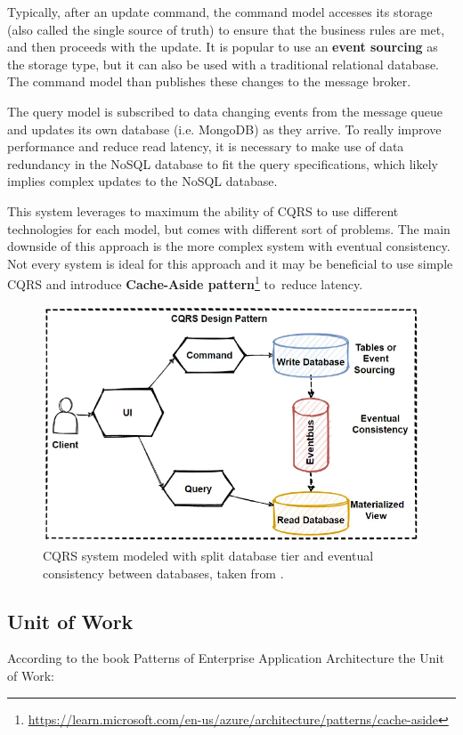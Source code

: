 Typically, after an update command, the command model accesses its storage (also called the single source of truth) to ensure that the business rules are met, and then proceeds with the update. It is popular to use an \textbf{event sourcing} as the storage type, but it can also be used with a traditional relational database. The command model than publishes these changes to the message broker.

The query model is subscribed to data changing events from the message queue and updates its own database (i.e. MongoDB) as they arrive. To really improve performance and reduce read latency, it is necessary to make use of data redundancy in the NoSQL database to fit the query specifications, which likely implies complex updates to the NoSQL database.

This system leverages to maximum the ability of CQRS to use different technologies for each model, but comes with different sort of problems. The main downside of this approach is the more complex system with eventual consistency. Not every system is ideal for this approach and it may be beneficial to use simple CQRS and introduce \textbf{Cache-Aside pattern}\footnote{\url{https://learn.microsoft.com/en-us/azure/architecture/patterns/cache-aside}} to~reduce latency.

\begin{figure} [H]
    \centering
    \includegraphics[width=\textwidth]{figures/cqrs-es.png}
    \caption{CQRS system modeled with split database tier and eventual consistency between databases, taken from \cite{mehmet_ozkaya:cqrs}.}
    \label{fig:arch:cqrs_es}
\end{figure}

\newpage
\subsection{Unit of Work}
\label{theory:unit_of_work}
According to the book Patterns of Enterprise Application Architecture \cite{martin_fowler:poeaa:unit_of_work} the Unit of Work:

